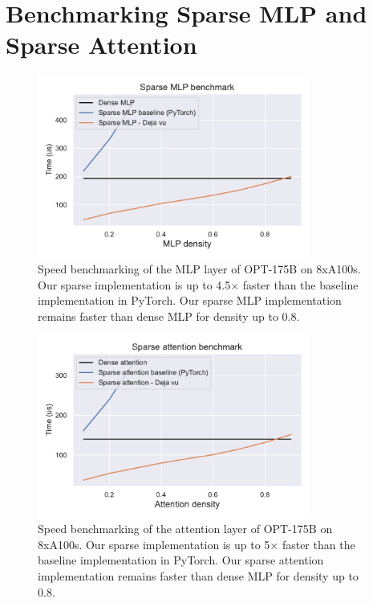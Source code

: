 \section{Benchmarking Sparse MLP and Sparse Attention}
\label{sec:mlp_attn_benchmarks}

\begin{figure}[h]
  \centering
  \includegraphics[width=0.8\textwidth]{figure/mlp_sparse_speed.pdf}
  \caption{\label{fig:mlp_sparse_speed}Speed benchmarking of the MLP layer of
    OPT-175B on 8xA100s. Our sparse implementation is up to 4.5$\times$ faster than
    the baseline implementation in PyTorch. Our sparse MLP implementation
    remains faster than dense MLP for density up to 0.8.}
\end{figure}
\begin{figure}[h]
  \centering
  \includegraphics[width=0.8\textwidth]{figure/attn_sparse_speed.pdf}
  \caption{\label{fig:attn_sparse_speed}Speed benchmarking of the attention layer of
    OPT-175B on 8xA100s. Our sparse implementation is up to 5$\times$ faster than
    the baseline implementation in PyTorch. Our sparse attention implementation
    remains faster than dense MLP for density up to 0.8.}
\end{figure}

